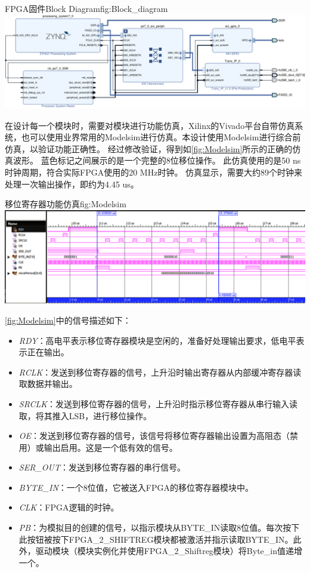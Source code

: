 \documentclass[supercite]{HustGraduPaper}
\begin{document}
\begin{generalfig}[htb]{FPGA固件Block Diagram}{fig:Block_diagram}
	\includegraphics[width=\linewidth]{Figures/Block_diagram.pdf}
\end{generalfig}

在设计每一个模块时，需要对模块进行功能仿真，Xilinx的Vivado平台自带仿真系统，也可以使用业界常用的Modelsim进行仿真。本设计使用Modelsim进行综合前仿真，以验证功能正确性。
经过修改验证，得到如\autoref{fig:Modelsim}所示的正确的仿真波形。
蓝色标记之间展示的是一个完整的8位移位操作。
此仿真使用的是50 ns时钟周期，符合实际FPGA使用的20 MHz时钟。
仿真显示，需要大约89个时钟来处理一次输出操作，即约为4.45 us。

\begin{generalfig}[htb]{移位寄存器功能仿真}{fig:Modelsim}
	\includegraphics[width=\linewidth]{Figures/Modelsim.png}
\end{generalfig}	

\autoref{fig:Modelsim}中的信号描述如下：
\begin{itemize}
	\item {\itshape RDY}：高电平表示移位寄存器模块是空闲的，准备好处理输出要求，低电平表示正在输出。
	\item {\itshape RCLK}：发送到移位寄存器的信号，上升沿时输出寄存器从内部缓冲寄存器读取数据并输出。
	\item {\itshape SRCLK}：发送到移位寄存器的信号，上升沿时指示移位寄存器从串行输入读取，将其推入LSB，进行移位操作。
	\item {\itshape OE}：发送到移位寄存器的信号，该信号将移位寄存器输出设置为高阻态（禁用）或输出启用。这是一个低有效的信号。
	\item {\itshape SER\_OUT}：发送到移位寄存器的串行信号。
	\item {\itshape BYTE\_IN}：一个8位值，它被送入FPGA的移位寄存器模块中。
	\item {\itshape CLK}：FPGA逻辑的时钟。
	\item {\itshape PB}：为模拟目的创建的信号，以指示模块从BYTE\_IN读取8位值。每次按下此按钮被按下FPGA\_2\_SHIFTREG模块都被激活并指示读取BYTE\_IN。此外，驱动模块（模块实例化并使用FPGA\_2\_Shiftreg模块）将Byte\_in值递增一个。
\end{itemize}
\end{document}
